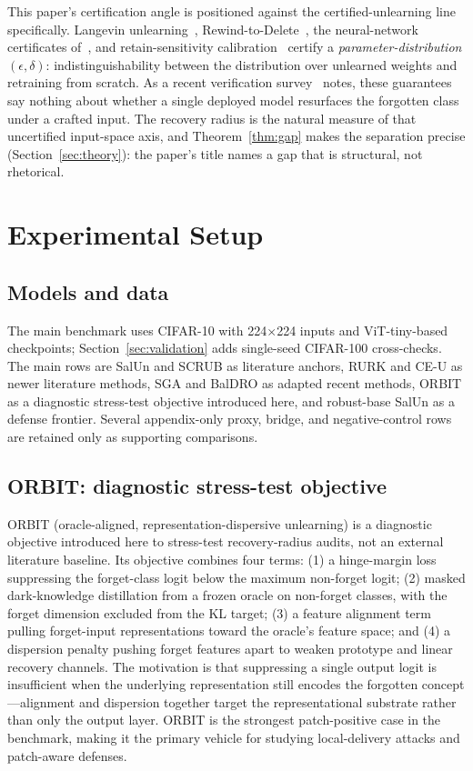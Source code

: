 \documentclass[11pt]{article}
\begin{document}
This paper's certification angle is positioned against the certified-unlearning line specifically. Langevin unlearning~\cite{chien2024langevin}, Rewind-to-Delete~\cite{mu2025rewind}, the neural-network certificates of~\cite{koloskova2025certified}, and retain-sensitivity calibration~\cite{heinzler2026retain} certify a \emph{parameter-distribution} $(\epsilon,\delta)$: indistinguishability between the distribution over unlearned weights and retraining from scratch. As a recent verification survey~\cite{xue2026survey} notes, these guarantees say nothing about whether a single deployed model resurfaces the forgotten class under a crafted input. The recovery radius is the natural measure of that uncertified input-space axis, and Theorem~\ref{thm:gap} makes the separation precise (Section~\ref{sec:theory}): the paper's title names a gap that is structural, not rhetorical.

\section{Experimental Setup}
\subsection{Models and data}
The main benchmark uses CIFAR-10 with 224$\times$224 inputs and ViT-tiny-based checkpoints; Section~\ref{sec:validation} adds single-seed CIFAR-100 cross-checks. The main rows are SalUn and SCRUB as literature anchors, RURK and CE-U as newer literature methods, SGA and BalDRO as adapted recent methods, ORBIT as a diagnostic stress-test objective introduced here, and robust-base SalUn as a defense frontier. Several appendix-only proxy, bridge, and negative-control rows are retained only as supporting comparisons.



\subsection{ORBIT: diagnostic stress-test objective}
ORBIT (oracle-aligned, representation-dispersive unlearning) is a diagnostic objective introduced here to stress-test recovery-radius audits, not an external literature baseline. Its objective combines four terms: (1) a hinge-margin loss suppressing the forget-class logit below the maximum non-forget logit; (2) masked dark-knowledge distillation from a frozen oracle on non-forget classes, with the forget dimension excluded from the KL target; (3) a feature alignment term pulling forget-input representations toward the oracle's feature space; and (4) a dispersion penalty pushing forget features apart to weaken prototype and linear recovery channels. The motivation is that suppressing a single output logit is insufficient when the underlying representation still encodes the forgotten concept---alignment and dispersion together target the representational substrate rather than only the output layer. ORBIT is the strongest patch-positive case in the benchmark, making it the primary vehicle for studying local-delivery attacks and patch-aware defenses.
\end{document}

